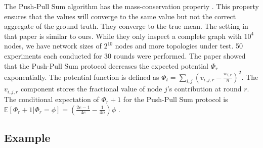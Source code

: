 

The Push-Pull Sum algorithm has the mass-conservation property \cite{nugroho2023PushPullSumDataAg}. This property ensures that the values will converge to the same value but not the correct aggregate of the ground truth. They converge to the true mean. The setting in that paper is similar to ours. While they only inspect a complete graph with $10^{4}$ nodes, we have network sizes of $2^{10}$ nodes and more topologies under test. 50 experiments each conducted for 30 rounds were performed. The paper showed that the Push-Pull Sum protocol decreases the expected potential $\Phi_r$ exponentially. The potential function is defined as $\Phi_t=\sum_{i,j}\left(v_{i,j,r}-\frac{w_{i,r}}{n}\right)^{2}$. The $v_{i,j,r}$ component stores the fractional value of node $j$'s contribution at round $r$. The conditional expectation of $\Phi_r+1$ for the Push-Pull Sum protocol is $\mathbb{E}[\Phi_r+1|\Phi_r=\phi]=(\frac{2e-1}{4e}-\frac{1}{4n})\phi$ \cite{nugroho2023PushPullSumDataAg}.

\subsection{Example}\label{subsec:examplePPS}

